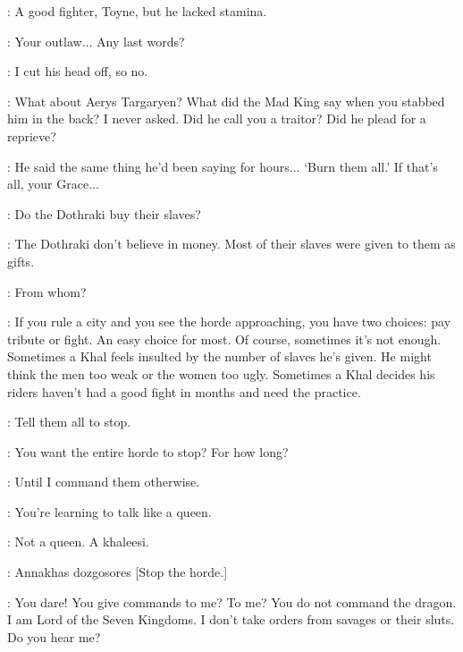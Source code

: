 \SELMY: A good fighter, Toyne, but he lacked stamina. 

\ROBERT: Your outlaw$\ldots$ Any last words? 

\JAIME: I cut his head off, so no. 

\ROBERT: What about Aerys Targaryen? What did the Mad King say when you stabbed him in the back? I never asked. Did he call you a traitor? Did he plead for a reprieve? 

\JAIME: He said the same thing he'd been saying for hours$\ldots$ `Burn them all.' If that's all, your Grace$\ldots$ 


\scene



\DAENERYS: Do the Dothraki buy their slaves? 

\JORAH: The Dothraki don't believe in money. Most of their slaves were given to them as gifts. 

\DAENERYS: From whom? 

\JORAH: If you rule a city and you see the horde approaching, you have two choices: pay tribute or fight. An easy choice for most. Of course, sometimes it's not enough. Sometimes a Khal feels insulted by the number of slaves he's given. He might think the men too weak or the women too ugly. Sometimes a Khal decides his riders haven't had a good fight in months and need the practice. 


\DAENERYS: Tell them all to stop. 

\JORAH: You want the entire horde to stop? For how long? 

\DAENERYS: Until I command them otherwise. 

\JORAH: You're learning to talk like a queen. 

\DAENERYS: Not a queen. A khaleesi. 

\JORAH: Annakhas dozgosores [Stop the horde.]


\VISERYS: You dare! You give commands to me? To me?  You do not command the dragon. I am Lord of the Seven Kingdoms. I don't take orders from savages or their sluts. Do you hear me? 


